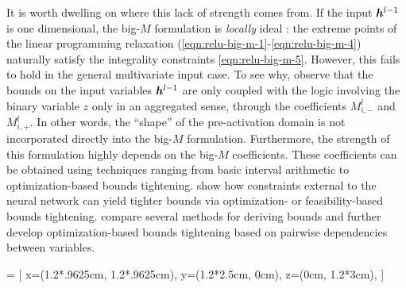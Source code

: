 It is worth dwelling on where this lack of strength comes from. If the input ${\bm{h}}^{l-1}$ is one dimensional, the big-$M$ formulation is \emph{locally} ideal \citep{vielma2015mixed}: the extreme points of the linear programming relaxation (\ref{eqn:relu-big-m-1}-\ref{eqn:relu-big-m-4}) naturally satisfy the integrality constraints \eqref{eqn:relu-big-m-5}. However, this fails to hold in the general multivariate input case. To see why, observe that the bounds on the input variables ${\bm{h}}^{l-1}$ are only coupled with the logic involving the binary variable $z$ only in an aggregated sense, through the coefficients $M^l_{i,-}$ and $M^l_{i,+}$. In other words, the ``shape'' of the pre-activation domain is not incorporated directly into the big-$M$ formulation. 
Furthermore, the strength of this formulation highly depends on the big-$M$ coefficients. 
These coefficients can be obtained using techniques ranging from basic interval arithmetic to optimization-based bounds tightening. 
\cite{grimstad2019surrogate} show how constraints external to the neural network can yield tighter bounds via optimization- or feasibility-based bounds tightening. 
\cite{rossig2021advances} compare several methods for deriving bounds and further develop optimization-based bounds tightening based on pairwise dependencies between variables. 

 = [
  x={(1.2*.9625cm, 1.2*.9625cm)},
  y={(1.2*2.5cm, 0cm)},
  z={(0cm, 1.2*3cm)},
]


